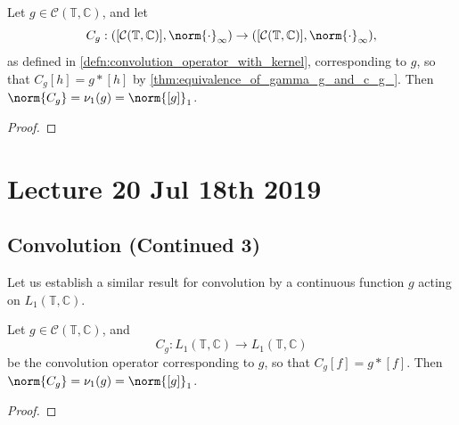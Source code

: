 \documentclass[notoc,notitlepage]{tufte-book}
\begin{document}
\begin{thm}\label{thm:convolution_as_a_normalizer}
  Let $g \in \mathcal{C}(\mathbb{T}, \mathbb{C})$, and let
  \begin{equation*}
    C_g : ([\mathcal{C}(\mathbb{T}, \mathbb{C})], \norm{\cdot}_{\infty})
      \to ([\mathcal{C}(\mathbb{T}, \mathbb{C})], \norm{\cdot}_{\infty}),
  \end{equation*}
  as defined in \cref{defn:convolution_operator_with_kernel},
  corresponding to $g$, so that $C_g[h] = g * [h]$ by
  \cref{thm:equivalence_of_gamma_g_and_c_g_}.
  Then $\norm{C_g} = \nu_1(g) = \norm{[g]}_1$.
\end{thm}

\begin{proof}
\end{proof}



\chapter{Lecture 20 Jul 18th 2019}%
\label{chp:lecture_20_jul_18th_2019}

\section{Convolution (Continued 3)}%
\label{sec:convolution_continued_3}

Let us establish a similar result for convolution
by a continuous function $g$ acting on $L_1(\mathbb{T}, \mathbb{C})$.

\begin{thm}\label{thm:convolution_operator_for_g_on_l_1_mathbb_t_mathbb_c_}
  Let $g \in \mathcal{C}(\mathbb{T}, \mathbb{C})$, and
  \begin{equation*}
    C_g : L_1(\mathbb{T}, \mathbb{C}) \to L_1(\mathbb{T}, \mathbb{C})
  \end{equation*}
  be the convolution operator corresponding to $g$, so that $C_g[f] = g * [f]$.
  Then $\norm{C_g} = \nu_1(g) = \norm{[g]}_1$.
\end{thm}

\begin{proof}
\end{proof}
\end{document}

